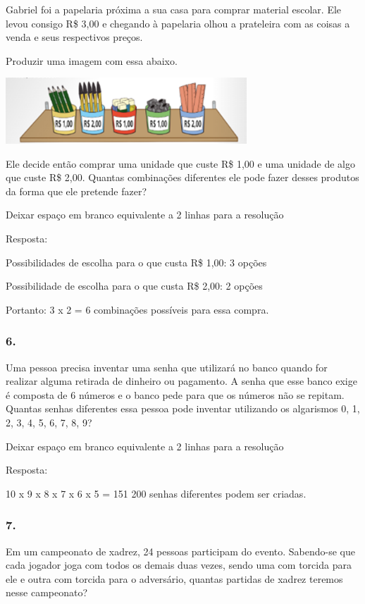 Gabriel foi a papelaria próxima a sua casa para comprar material
escolar. Ele levou consigo R\$ 3,00 e chegando à papelaria olhou a
prateleira com as coisas a venda e seus respectivos preços.

Produzir uma imagem com essa abaixo.

\includegraphics[width=3.55864in,height=0.97508in]{media/image139.png}

Ele decide então comprar uma unidade que custe R\$ 1,00 e uma unidade de
algo que custe R\$ 2,00. Quantas combinações diferentes ele pode fazer
desses produtos da forma que ele pretende fazer?

Deixar espaço em branco equivalente a 2 linhas para a resolução

Resposta:

Possibilidades de escolha para o que custa R\$ 1,00: 3 opções

Possibilidade de escolha para o que custa R\$ 2,00: 2 opções

Portanto: 3 x 2 = 6 combinações possíveis para essa compra.

\subsubsection{6.}\label{section-135}

Uma pessoa precisa inventar uma senha que utilizará no banco quando for
realizar alguma retirada de dinheiro ou pagamento. A senha que esse
banco exige é composta de 6 números e o banco pede para que os números
não se repitam. Quantas senhas diferentes essa pessoa pode inventar
utilizando os algarismos 0, 1, 2, 3, 4, 5, 6, 7, 8, 9?

Deixar espaço em branco equivalente a 2 linhas para a resolução

Resposta:

10 x 9 x 8 x 7 x 6 x 5 = 151 200 senhas diferentes podem ser criadas.

\subsubsection{7.}\label{section-136}

Em um campeonato de xadrez, 24 pessoas participam do evento. Sabendo-se
que cada jogador joga com todos os demais duas vezes, sendo uma com
torcida para ele e outra com torcida para o adversário, quantas partidas
de xadrez teremos nesse campeonato?

